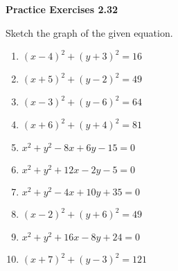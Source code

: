 \vspace{0.3ex}
\noindent\textbf{Practice Exercises 2.32}

\vspace{0.2ex}

Sketch the graph of the given equation.
\begin{multicols}{2}
\begin{enumerate}
    \item $(x - 4)^2 + (y + 3)^2 = 16$
    \item $(x + 5)^2 + (y - 2)^2 = 49$
    \item $(x - 3)^2 + (y - 6)^2 = 64$
    \item $(x + 6)^2 + (y + 4)^2 = 81$
    \item $x^2 + y^2 - 8x + 6y - 15 = 0$
    \item $x^2 + y^2 + 12x - 2y - 5 = 0$
    \item $x^2 + y^2 - 4x + 10y + 35 = 0$
    \item $(x - 2)^2 + (y + 6)^2 = 49$
    \item $x^2 + y^2 + 16x - 8y + 24 = 0$
    \item $(x + 7)^2 + (y - 3)^2 = 121$
\end{enumerate}
\end{multicols}
